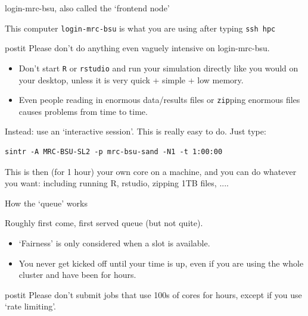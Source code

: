 \documentclass[t,10pt]{beamer}
\newenvironment{highlightblock}[0]%
  {\begin{beamercolorbox}[sep=1em]{postit}}%
  {\end{beamercolorbox}}
\begin{document}
\begin{frame}[fragile]{login-mrc-bsu, also called the `frontend node'}

This computer \texttt{login-mrc-bsu} is what you are using after typing \texttt{ssh hpc}

\bigskip
\begin{highlightblock}
Please don't do anything even vaguely intensive on login-mrc-bsu.
\end{highlightblock}

\begin{itemize}
\item Don't start \texttt{R} or \texttt{rstudio} and run your simulation directly like you would on your desktop, unless it is very quick + simple + low memory.
\item Even people reading in enormous data/results files or \texttt{zip}ping enormous files causes problems from time to time.
\end{itemize}

\vspace{\baselineskip}
\alert{Instead: use an `interactive session'. This is really easy to do}. Just type:

\begin{verbatim}
sintr -A MRC-BSU-SL2 -p mrc-bsu-sand -N1 -t 1:00:00
\end{verbatim}
This is then (for 1 hour) your own core on a machine, and you can do whatever you want: including running R, rstudio, zipping 1TB files, ....
\end{frame}

\begin{frame}{How the `queue' works}

Roughly \alert{first come, first served} queue (but not quite).

\bigskip
\begin{itemize}
\item `Fairness' is only considered when a slot is available.
\item You never get kicked off until your time is up, even if you are using the whole cluster and have been for hours.
\end{itemize}

\bigskip
\begin{highlightblock}
Please don't submit jobs that use 100s of cores for hours, except if you use `rate limiting'.
\end{highlightblock}

\end{frame}
\end{document}
